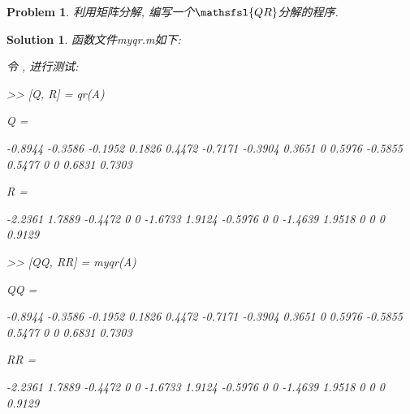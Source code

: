 \documentclass[a4paper, 12pt]{ctexart}
\title{\TITLE}
\author{\AUTHOR}
\date{\today}
\let\oldlstinputlisting
\renewcommand{}[2][\empty]{
    \par\nolinenumbers\oldlstinputlisting[#1]{#2}\linenumbers\par
}
\let\oldlstlisting\lstlisting
\let\oldendlstlisting\endlstlisting
\renewenvironment{lstlisting}
    {\par\nolinenumbers\oldlstlisting}
    {\oldendlstlisting\endnolinenumbers\par}
\renewcommand{\lstinline}[2][]{\colorbox{lightgray}{\oldlstinline[#1]{#2}}}
\newcommand{\matlabinline}[1]{
    \lstinline[style=MATLAB-editor, basicstyle=\mlttfamily]{#1}}
\theoremstyle{plain}
\newtheorem{problem}{Problem}[section]
\theoremstyle{plain}
\theoremstyle{plain}
\theoremstyle{nonumberplain}
\newtheorem{solution}{Solution}
\newcommand*{\matr}[1]{\ensuremath{\mathsfsl{#1}}} %
\begin{document}

    \maketitle
    \thispagestyle{empty}





    \newpage
    \pagestyle{fancy}
    \linenumbers

    \begin{problem}
        利用矩阵分解, 编写一个$\matr{QR}$分解的程序.
    \end{problem}

    \begin{solution}
        函数文件myqr.m如下:

        

        令\matlabinline{A = [2 -1 0 0; -1 2 -1 0; 0 -1 2 -1; 0 0 -1 2]}, 进行测试:

        \begin{lstlisting}[
            caption=内置qr函数测试,
            style=MATLAB-editor,
            basicstyle=\mlttfamily\scriptsize,
            numberstyle={\color{black!33}\scriptsize\sffamily}
        ]
>> [Q, R] = qr(A)

Q =
        
   -0.8944   -0.3586   -0.1952    0.1826
    0.4472   -0.7171   -0.3904    0.3651
         0    0.5976   -0.5855    0.5477
         0         0    0.6831    0.7303


R =
        
   -2.2361    1.7889   -0.4472         0
         0   -1.6733    1.9124   -0.5976
         0         0   -1.4639    1.9518
         0         0         0    0.9129
        \end{lstlisting}

        \begin{lstlisting}[
            caption=myqr.m测试,
            style=MATLAB-editor,
            basicstyle=\mlttfamily\scriptsize,
            numberstyle={\color{black!33}\scriptsize\sffamily}
        ]
>> [QQ, RR] = myqr(A)

QQ =

   -0.8944   -0.3586   -0.1952    0.1826
    0.4472   -0.7171   -0.3904    0.3651
         0    0.5976   -0.5855    0.5477
         0         0    0.6831    0.7303


RR =

   -2.2361    1.7889   -0.4472         0
         0   -1.6733    1.9124   -0.5976
         0         0   -1.4639    1.9518
         0         0         0    0.9129
        \end{lstlisting}
    \end{solution}
\end{document}
